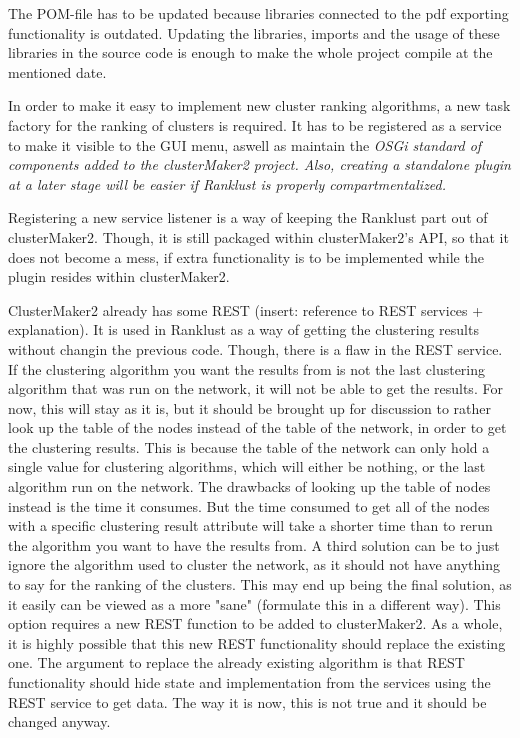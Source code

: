 \documentclass[UKenglish]{ifimaster}
\begin{document}
The POM-file has to be updated because libraries connected to the pdf exporting functionality is outdated. Updating the
libraries, imports and the usage of these libraries in the source code is enough to make the whole project compile at
the mentioned date.

In order to make it easy to implement new cluster ranking algorithms, a new task factory for the ranking of clusters is
required. It has to be registered as a service to make it visible to the GUI menu, aswell as maintain the \it{OSGi}
standard of components added to the \it{clusterMaker2} project. Also, creating a standalone plugin at a later stage will
be easier if Ranklust is properly compartmentalized.

Registering a new service listener is a way of keeping the Ranklust part out of clusterMaker2. Though, it is still
packaged within clusterMaker2's API, so that it does not become a mess, if extra functionality is to be implemented
while the plugin resides within clusterMaker2.

ClusterMaker2 already has some REST (insert: reference to REST services + explanation). It is used in Ranklust as a way
of getting the clustering results without changin the previous code. Though, there is a flaw in the REST service. If the
clustering algorithm you want the results from is not the last clustering algorithm that was run on the network, it will
not be able to get the results. For now, this will stay as it is, but it should be brought up for discussion to rather
look up the table of the nodes instead of the table of the network, in order to get the clustering results. This is
because the table of the network can only hold a single value for clustering algorithms, which will either be nothing,
or the last algorithm run on the network. The drawbacks of looking up the table of nodes instead is the time it
consumes. But the time consumed to get all of the nodes with a specific clustering result attribute will take a shorter
time than to rerun the algorithm you want to have the results from. A third solution can be to just ignore the algorithm
used to cluster the network, as it should not have anything to say for the ranking of the clusters. This may end up
being the final solution, as it easily can be viewed as a more "sane" (formulate this in a different way). This option
requires a new REST function to be added to clusterMaker2. As a whole, it is highly possible that this new REST
functionality should replace the existing one. The argument to replace the already existing algorithm is that REST
functionality should hide state and implementation from the services using the REST service to get data. The way it is
now, this is not true and it should be changed anyway.
\end{document}
